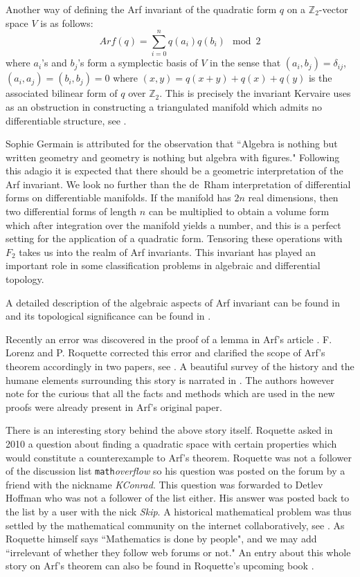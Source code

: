 \documentclass[12pt]{amsart}
\begin{document}
Another way of defining the Arf invariant of the quadratic form $q$ on a ${\mathbb{Z}}_2$-vector space $V$ is as follows:
\[ Arf(q)=\sum_{i=0}^{n}q(a_i)q(b_i)\mod 2 \]
where $a_i$'s and $b_j$'s form a symplectic basis of $V$ in the sense that $(a_i,b_j)=\delta_{ij}$, $(a_i,a_j)=(b_i,b_j)=0$ where $(x,y)=q(x+y)+q(x)+q(y)$ is the associated bilinear form of $q$ over ${\mathbb{Z}}_2$. This is precisely the invariant Kervaire uses as an obstruction in constructing a triangulated manifold which admits no differentiable structure, see \cite{kervaire}.

Sophie Germain is attributed for the observation that ``Algebra is nothing but written geometry and geometry is nothing but algebra with figures." Following this adagio  it is expected that there should be a geometric interpretation of the Arf invariant. We look no further than the de~Rham interpretation of differential forms on differentiable manifolds. If the manifold has $2n$ real dimensions, then two differential forms of length $n$ can be multiplied to obtain a volume form which after integration over the manifold yields a number, and this is a perfect setting for the application of a quadratic form. Tensoring these operations with $F_2$ takes us into the realm of Arf invariants. This invariant has played an important role in some classification problems in algebraic and differential topology.

A detailed description of the algebraic aspects of Arf invariant can be found in \cite{ikeda2,ikeda3} and its topological significance  can be found in \cite{onder}.

Recently an error was discovered in the proof of a lemma in Arf's article \cite{carf2}. F. Lorenz and P. Roquette corrected this error and clarified the scope of Arf's theorem accordingly in two papers, see \cite{LR1,LR2}. A beautiful survey of the history and the humane elements surrounding this story is narrated in \cite{LR3}. The authors however note for the curious that all the facts and methods which are used in the new proofs were already present in Arf's original paper.

There is an interesting story behind the above story itself. Roquette asked in 2010 a question about finding a quadratic space with certain properties which would constitute a counterexample to Arf's theorem. Roquette was not a follower of the discussion list  {\tt math}{\it overflow} so his question was posted on the forum by a friend with the nickname \emph{KConrad}. This question was forwarded to Detlev Hoffman who was not a follower of the list either. His answer was posted back to the list by a user with the nick \emph{Skip}. A historical mathematical problem was thus settled by the mathematical community on the internet collaboratively, see \cite{mathoverflow}. As Roquette himself says ``Mathematics is done by people", and we may add ``irrelevant of whether they follow web forums or not." An entry about this whole story on Arf's theorem can also be found in Roquette's upcoming book \cite{roquette3}.
\end{document}
